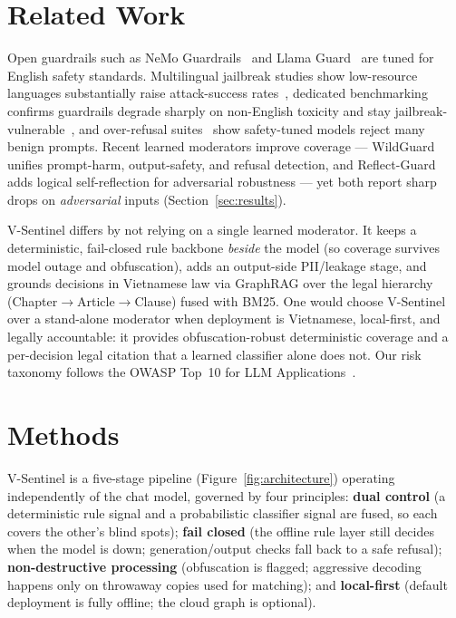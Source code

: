 \documentclass[11pt, a4paper]{article}
\begin{document}
\section{Related Work}
Open guardrails such as NeMo Guardrails~\cite{nemo} and Llama Guard~\cite{llamaguard} are tuned for English safety standards. Multilingual jailbreak studies show low-resource languages substantially raise attack-success rates~\cite{multijail}, dedicated benchmarking confirms guardrails degrade sharply on non-English toxicity and stay jailbreak-vulnerable~\cite{multitox}, and over-refusal suites~\cite{xstest} show safety-tuned models reject many benign prompts. Recent learned moderators improve coverage --- WildGuard~\cite{wildguard} unifies prompt-harm, output-safety, and refusal detection, and Reflect-Guard~\cite{reflectguard} adds logical self-reflection for adversarial robustness --- yet both report sharp drops on \emph{adversarial} inputs (Section~\ref{sec:results}).

V-Sentinel differs by not relying on a single learned moderator. It keeps a deterministic, fail-closed rule backbone \emph{beside} the model (so coverage survives model outage and obfuscation), adds an output-side PII/leakage stage, and grounds decisions in Vietnamese law via GraphRAG over the legal hierarchy (Chapter$\rightarrow$Article$\rightarrow$Clause) fused with BM25. One would choose V-Sentinel over a stand-alone moderator when deployment is Vietnamese, local-first, and legally accountable: it provides obfuscation-robust deterministic coverage and a per-decision legal citation that a learned classifier alone does not. Our risk taxonomy follows the OWASP Top~10 for LLM Applications~\cite{owasp}.

\section{Methods}
V-Sentinel is a five-stage pipeline (Figure~\ref{fig:architecture}) operating independently of the chat model, governed by four principles: \textbf{dual control} (a deterministic rule signal and a probabilistic classifier signal are fused, so each covers the other's blind spots); \textbf{fail closed} (the offline rule layer still decides when the model is down; generation/output checks fall back to a safe refusal); \textbf{non-destructive processing} (obfuscation is flagged; aggressive decoding happens only on throwaway copies used for matching); and \textbf{local-first} (default deployment is fully offline; the cloud graph is optional).
\end{document}
